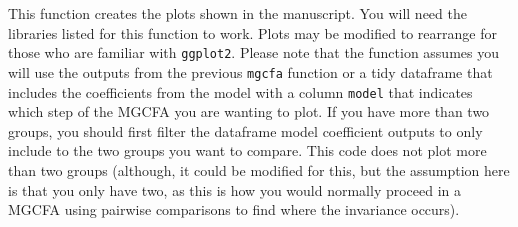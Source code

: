 \documentclass[
  man]{apa6}
\begin{document}
This function creates the plots shown in the manuscript. You will need the libraries listed for this function to work. Plots may be modified to rearrange for those who are familiar with \texttt{ggplot2}. Please note that the function assumes you will use the outputs from the previous \texttt{mgcfa} function or a tidy dataframe that includes the coefficients from the model with a column \texttt{model} that indicates which step of the MGCFA you are wanting to plot. If you have more than two groups, you should first filter the dataframe model coefficient outputs to only include to the two groups you want to compare. This code does not plot more than two groups (although, it could be modified for this, but the assumption here is that you only have two, as this is how you would normally proceed in a MGCFA using pairwise comparisons to find where the invariance occurs).

\small
\end{document}

